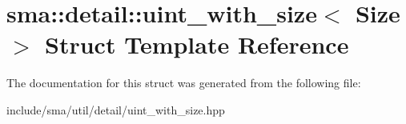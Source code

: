 \hypertarget{structsma_1_1detail_1_1uint__with__size}{\section{sma\-:\-:detail\-:\-:uint\-\_\-with\-\_\-size$<$ Size $>$ Struct Template Reference}
\label{structsma_1_1detail_1_1uint__with__size}
}


The documentation for this struct was generated from the following file\-:\begin{DoxyCompactItemize}
\item 
include/sma/util/detail/uint\-\_\-with\-\_\-size.\-hpp\end{DoxyCompactItemize}
